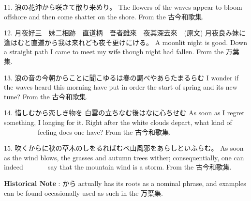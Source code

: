 \par{11. 浪の花沖から咲きて散り来めり。 \hfill\break
The flowers of the waves appear to bloom offshore and then come shatter on the shore. \hfill\break
From the 古今和歌集. }

\par{12. 月夜好三　妹二相跡　直道柄　吾者雖來　夜其深去來　(原文) \hfill\break
月夜良み妹に逢はむと直道から我は来れども夜そ更けにける。 \hfill\break
A moonlit night is good. Down a straight path I came to meet my wife though night had fallen. \hfill\break
From the 万葉集. }

\par{13. 浪の音の今朝からことに聞こゆるは春の調べやあらたまるらむ \hfill\break
I wonder if the waves heard this morning have put in order the start of spring and its new tune? \hfill\break
From the 古今和歌集. }

\par{14. 惜しむから恋しき物を  白雲の立ちなむ後はなに心ちせむ \hfill\break
As soon as I regret something, I longing for it. Right after the white clouds depart, what kind of                 feeling does one have? \hfill\break
From the 古今和歌集. }

\par{15. 吹くからに秋の草木のしをるればむべ山風邪をあらしといふらむ。 \hfill\break
As soon as the wind blows, the grasses and autumn trees wither; consequentially, one can indeed         say that the mountain wind is a storm. \hfill\break
From the 古今和歌集. }

\par{\textbf{Historical Note }: から actually has its roots as a nominal phrase, and examples can be found occasionally used as such in the 万葉集. }
    